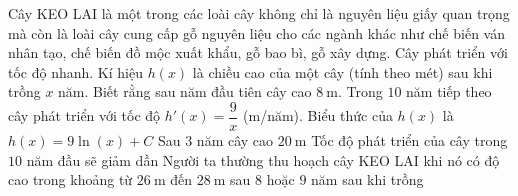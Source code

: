 \begin{ex}%
	Cây KEO LAI là một trong các loài cây không chỉ là nguyên  liệu giấy quan trọng mà còn là loài cây cung cấp gỗ nguyên liệu cho các ngành khác như chế biến ván nhân tạo, chế biến đồ mộc xuất khẩu, gỗ bao bì, gỗ xây dựng. Cây phát triển với tốc độ nhanh. Kí hiệu $h(x)$ là chiều cao của một cây (tính theo mét) sau khi trồng $x$ năm. Biết rằng sau năm đầu tiên cây cao $8~\mathrm{m}$. Trong $10$ năm tiếp theo cây phát triển với tốc độ $h'(x)=\dfrac{9}{x}$ (m/năm).
	 \choiceTF
		 {\True Biểu thức của $h(x)$ là $h(x)=9\ln(x)+C$}
		{Sau $3$  năm cây cao $20~\mathrm{m}$}
		{\True Tốc độ phát triển  của cây trong $10$ năm đầu sẽ giảm dần}
		{\True Người ta thường thu hoạch cây KEO LAI khi nó có độ cao trong khoảng từ $26~\mathrm{m}$ đến $28~\mathrm{m}$ sau $8$ hoặc $9$ năm sau khi trồng} 
\end{ex}

